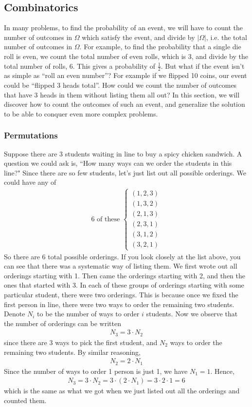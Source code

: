 \documentclass[11pt,letterpaper]{article}
\numberwithin{theorem}{section}
\numberwithin{definition}{section}
\numberwithin{lemma}{section}
\numberwithin{corollary}{section}
\numberwithin{proposition}{section}
\theoremstyle{definition}
\numberwithin{remark}{section}
\numberwithin{claim}{section}
\numberwithin{observation}{section}
\numberwithin{fact}{section}
\numberwithin{assumption}{section}
\numberwithin{example}{section}
\numberwithin{exercise}{section}
\begin{document}
\subsection{Combinatorics}
In many problems, to find the probability of an event, we will have to count the number of outcomes in $\Omega$ which satisfy the event, and divide by $|\Omega|$, i.e. the total number of outcomes in $\Omega$. For example, to find the probability that a single die roll is even, we count the total number of even rolls, which is 3, and divide by the total number of rolls, 6. This gives a probability of $\frac{1}{2}$. But what if the event isn't as simple as ``roll an even number''? For example if we flipped 10 coins, our event could be ``flipped 3 heads total''. How could we count the number of outcomes that have 3 heads in them without listing them all out? In this section, we will discover how to count the outcomes of such an event, and generalize the solution to be able to conquer even more complex problems.

\subsubsection{Permutations}
Suppose there are 3 students waiting in line to buy a spicy chicken sandwich. A question we could ask is, ``How many ways can we order the students in this line?" Since there are so few students, let's just list out all possible orderings. We could have any of
\begin{align*}
\text{6 of these }\begin{cases}
(1,2,3) \\
(1,3,2) \\
(2,1,3) \\
(2,3,1) \\
(3,1,2) \\
(3,2,1) 
\end{cases}
\end{align*}
So there are 6 total possible orderings. If you look closely at the list above, you can see that there was a systematic way of listing them. We first wrote out all orderings starting with 1. Then came the orderings starting with 2, and then the ones that started with 3. In each of these groups of orderings starting with some particular student, there were two orderings. This is because once we fixed the first person in line, there were two ways to order the remaining two students. Denote $N_i$ to be the number of ways to order $i$ students. Now we observe that the number of orderings can be written
\begin{align*}
N_3 = 3 \cdot N_2
\end{align*}
since there are 3 ways to pick the first student, and $N_2$ ways to order the remaining two students. By similar reasoning,
\begin{align*}
N_2 = 2 \cdot N_1
\end{align*}
Since the number of ways to order 1 person is just 1, we have $N_1 = 1$. Hence,
\begin{align*}
N_3 = 3 \cdot N_2 = 3 \cdot (2 \cdot N_1) = 3 \cdot 2 \cdot 1 = 6
\end{align*}
which is the same as what we got when we just listed out all the orderings and counted them. 
\end{document}
